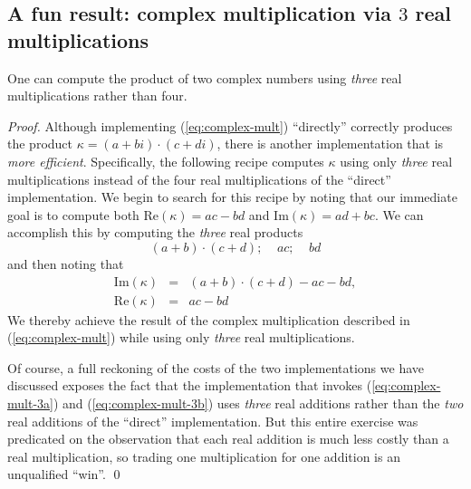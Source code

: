 \subsection{A fun result: complex
  multiplication via $3$ real multiplications}

\begin{prop}
One can compute the product of two complex numbers using {\em three}
real multiplications rather than four.
\end{prop}

\begin{proof}
Although implementing (\ref{eq:complex-mult}) ``directly'' correctly
produces the product $\kappa = (a+bi) \cdot (c+di)$, there is another
implementation that is {\em more efficient}.  Specifically, the
following recipe computes $\kappa$ using only {\em three} real
multiplications instead of the four real multiplications of the
``direct'' implementation.  We begin to search for this recipe by
noting that our immediate goal is to compute both Re$(\kappa) = ac-bd$
and Im$(\kappa) = ad+bc$.  We can accomplish this by computing the
{\em three} real products
\begin{equation}
\label{eq:complex-mult-3a}
(a+b) \cdot (c+d); \ \ \ \ \
ac;  \ \ \ \ \ bd
\end{equation}
and then noting that
\begin{equation}
\label{eq:complex-mult-3b}
\begin{array}{lcl}
\mbox{Im}(\kappa) & = & (a+b) \cdot (c+d) - ac -bd, \\
\mbox{Re}(\kappa) & = & ac -bd
\end{array}
\end{equation}
We thereby achieve the result of the complex multiplication described
in (\ref{eq:complex-mult}) while using only {\em three} real
multiplications.

Of course, a full reckoning of the costs of the two implementations we
have discussed exposes the fact that the implementation that invokes
(\ref{eq:complex-mult-3a}) and (\ref{eq:complex-mult-3b}) uses {\em
  three} real additions rather than the {\em two} real additions of
the ``direct'' implementation.  But this entire exercise was
predicated on the observation that each real addition is much less
costly than a real multiplication, so trading one multiplication for
one addition is an unqualified ``win''.  \qed
\end{proof}

